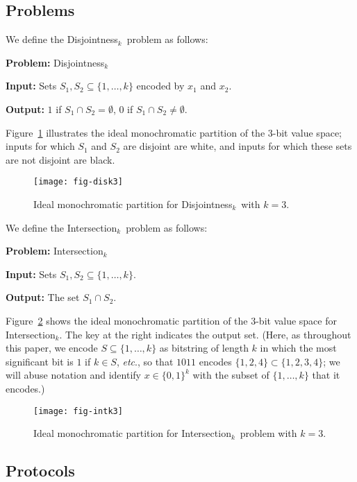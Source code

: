 \documentclass{article}
\theoremstyle{theorem}
\theoremstyle{definition}
\theoremstyle{remark}
\newcommand{\etc}{\emph{etc}}
\newcommand{\disjoint}{{\sc Dis\-joint\-ness}\ensuremath{_k}}
\newcommand{\intersection}{{\sc In\-ter\-sec\-tion}\ensuremath{_k}}
\begin{document}
\subsection{Problems}

We define the \disjoint\ problem as follows:

\noindent\textbf{Problem:} \disjoint

\noindent\textbf{Input:} Sets $S_1,S_2\subseteq\{1,\ldots,k\}$ encoded by $x_1$ and $x_2$.

\noindent\textbf{Output:} $1$ if $S_1\cap S_2 = \emptyset$, $0$ if $S_1\cap S_2 \neq \emptyset$.

Figure~\ref{fig:disk3} illustrates the ideal monochromatic partition of the $3$-bit value space; inputs for which $S_1$ and $S_2$ are disjoint are white, and inputs for which these sets are not disjoint are black.
\begin{figure}[htp]
\begin{center}
\texttt{[image: fig-disk3]}
\caption{Ideal monochromatic partition for \disjoint\ with $k=3$.}\label{fig:disk3}
\end{center}
\end{figure}


We define the \intersection\ problem as follows:

\noindent\textbf{Problem:} \intersection

\noindent\textbf{Input:} Sets $S_1,S_2\subseteq\{1,\ldots,k\}$.

\noindent\textbf{Output:} The set $S_1\cap S_2$.

Figure~\ref{fig:intk3} shows the ideal monochromatic partition of the $3$-bit value space for \intersection.  The key at the right indicates the output set.  (Here, as throughout this paper, we encode $S\subseteq \{1,\ldots,k\}$ as bitstring of length $k$ in which the most significant bit is $1$ if $k\in S$, \etc., so that $1011$ encodes $\{1,2,4\}\subset\{1,2,3,4\}$; we will abuse notation and identify $x\in\{0,1\}^k$ with the subset of $\{1,\ldots,k\}$ that it encodes.)
\begin{figure}[htp]
\begin{center}
\texttt{[image: fig-intk3]}
\end{center}
\caption{Ideal monochromatic partition for \intersection\ problem with $k=3$.}\label{fig:intk3}
\end{figure}



\subsection{Protocols}
\end{document}
